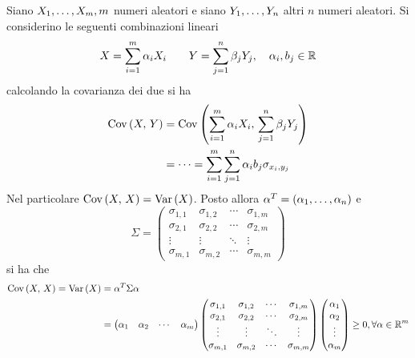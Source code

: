 \documentclass{subfiles}
\begin{document}
Siano \(\List{X}{1}{m}, m\) numeri aleatori e siano \(\List{Y}{1}{n}\) altri \(n\) numeri aleatori.
Si considerino le seguenti combinazioni lineari
\[
    X = \Sum{\alpha_{i} X_{i}}{i = 1}[m] \qquad Y = \Sum{\beta_{j} Y_{j}}{j = 1}[n], \quad \alpha_{i}, b_{j} \in \Real
\]
calcolando la covarianza dei due si ha
\[\begin{aligned}
        \Cov{X}{Y} & = \Cov{\Sum{\alpha_{i} X_{i}}{i = 1}[m]}{\Sum{\beta_{j} Y_{j}}{j = 1}[n]}        \\
                   & = \cdots = \Sum{\Sum{\alpha_{i}b_{j} \sigma_{x_{i}, y_{j}}}{j = 1}[n]}{i = 1}[m]
    \end{aligned}\]
Nel particolare \(\Cov{X}{X} = \Var{X}\).
Posto allora \(\alpha^{T} = \Tuple{\alpha}{1}{n}\) e
\[
    \Sigma = \begin{pmatrix}
        \sigma_{1,1} & \sigma_{1,2}  & \cdots & \sigma_{1, m} \\
        \sigma_{2,1} & \sigma_{2,2}  & \cdots & \sigma_{2, m} \\
        \vdots       & \vdots        & \ddots & \vdots        \\
        \sigma_{m,1} & \sigma_{m, 2} & \cdots & \sigma_{m,m}
    \end{pmatrix}\]
si ha che
\[\begin{aligned}
        \Cov{X}{X} = \Var{X} & = \alpha^{T} \Sigma \alpha                                                      \\
                             & = \begin{pmatrix}
                                     \alpha_{1} & \alpha_{2} & \cdots & \alpha_{m}
                                 \end{pmatrix} \begin{pmatrix}
                                                   \sigma_{1,1} & \sigma_{1,2}  & \cdots & \sigma_{1, m} \\
                                                   \sigma_{2,1} & \sigma_{2,2}  & \cdots & \sigma_{2, m} \\
                                                   \vdots       & \vdots        & \ddots & \vdots        \\
                                                   \sigma_{m,1} & \sigma_{m, 2} & \cdots & \sigma_{m,m}
                                               \end{pmatrix} \begin{pmatrix}
                                                                 \alpha_{1} \\
                                                                 \alpha_{2} \\
                                                                 \vdots     \\
                                                                 \alpha_{m}
                                                             \end{pmatrix} \ge 0, \forall \alpha \in \Real^{m}
    \end{aligned}\]
\end{document}

